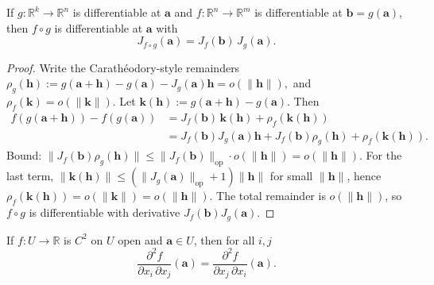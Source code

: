 \begin{theorem}
If $g:\mathbb{R}^k\to\mathbb{R}^n$ is differentiable at $\mathbf{a}$ and $f:\mathbb{R}^n\to\mathbb{R}^m$ is differentiable at $\mathbf{b}=g(\mathbf{a})$, then $f\circ g$ is differentiable at $\mathbf{a}$ with
\[
J_{f\circ g}(\mathbf{a}) = J_f(\mathbf{b})\,J_g(\mathbf{a}).
\]
\end{theorem}

\begin{proof}
Write the Carath\'eodory-style remainders
\(
\rho_g(\mathbf{h}) := g(\mathbf{a}+\mathbf{h})-g(\mathbf{a})-J_g(\mathbf{a})\mathbf{h}=o(\|\mathbf{h}\|),\)
and \(\rho_f(\mathbf{k})=o(\|\mathbf{k}\|).\) Let $\mathbf{k}(\mathbf{h}):=g(\mathbf{a}+\mathbf{h})-g(\mathbf{a})$. Then
\begin{align*}
f(g(\mathbf{a}+\mathbf{h})) - f(g(\mathbf{a}))
 &= J_f(\mathbf{b})\,\mathbf{k}(\mathbf{h}) + \rho_f(\mathbf{k}(\mathbf{h}))\\
 &= J_f(\mathbf{b})J_g(\mathbf{a})\mathbf{h} + J_f(\mathbf{b})\rho_g(\mathbf{h}) + \rho_f(\mathbf{k}(\mathbf{h})).
\end{align*}
Bound: $\|J_f(\mathbf{b})\rho_g(\mathbf{h})\|\le \|J_f(\mathbf{b})\|_{\mathrm{op}}\cdot o(\|\mathbf{h}\|)=o(\|\mathbf{h}\|)$. For the last term, $\|\mathbf{k}(\mathbf{h})\|\le (\|J_g(\mathbf{a})\|_{\mathrm{op}}+1)\|\mathbf{h}\|$ for small $\|\mathbf{h}\|$, hence $\rho_f(\mathbf{k}(\mathbf{h}))=o(\|\mathbf{k}\|)=o(\|\mathbf{h}\|)$. The total remainder is $o(\|\mathbf{h}\|)$, so $f\circ g$ is differentiable with derivative $J_f(\mathbf{b})J_g(\mathbf{a})$.
\end{proof}

\begin{theorem}
If $f:U\to\mathbb{R}$ is $C^2$ on $U$ open and $\mathbf{a}\in U$, then for all $i,j$
\[
\frac{\partial^2 f}{\partial x_i\,\partial x_j}(\mathbf{a}) = \frac{\partial^2 f}{\partial x_j\,\partial x_i}(\mathbf{a}).
\]
\end{theorem}

